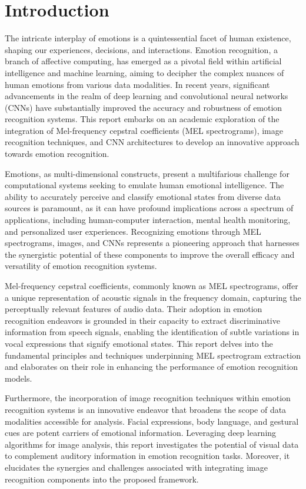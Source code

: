 \chapter{Introduction}


The intricate interplay of emotions is a quintessential facet of human existence, shaping our experiences, decisions, and interactions. Emotion recognition, a branch of affective computing, has emerged as a pivotal field within artificial intelligence and machine learning, aiming to decipher the complex nuances of human emotions from various data modalities. In recent years, significant advancements in the realm of deep learning and convolutional neural networks (CNNs) have substantially improved the accuracy and robustness of emotion recognition systems. This report embarks on an academic exploration of the integration of Mel-frequency cepstral coefficients (MEL spectrograms), image recognition techniques, and CNN architectures to develop an innovative approach towards emotion recognition.

Emotions, as multi-dimensional constructs, present a multifarious challenge for computational systems seeking to emulate human emotional intelligence. The ability to accurately perceive and classify emotional states from diverse data sources is paramount, as it can have profound implications across a spectrum of applications, including human-computer interaction, mental health monitoring, and personalized user experiences. Recognizing emotions through MEL spectrograms, images, and CNNs represents a pioneering approach that harnesses the synergistic potential of these components to improve the overall efficacy and versatility of emotion recognition systems.

Mel-frequency cepstral coefficients, commonly known as MEL spectrograms, offer a unique representation of acoustic signals in the frequency domain, capturing the perceptually relevant features of audio data. Their adoption in emotion recognition endeavors is grounded in their capacity to extract discriminative information from speech signals, enabling the identification of subtle variations in vocal expressions that signify emotional states. This report delves into the fundamental principles and techniques underpinning MEL spectrogram extraction and elaborates on their role in enhancing the performance of emotion recognition models.

Furthermore, the incorporation of image recognition techniques within emotion recognition systems is an innovative endeavor that broadens the scope of data modalities accessible for analysis. Facial expressions, body language, and gestural cues are potent carriers of emotional information. Leveraging deep learning algorithms for image analysis, this report investigates the potential of visual data to complement auditory information in emotion recognition tasks. Moreover, it elucidates the synergies and challenges associated with integrating image recognition components into the proposed framework.

